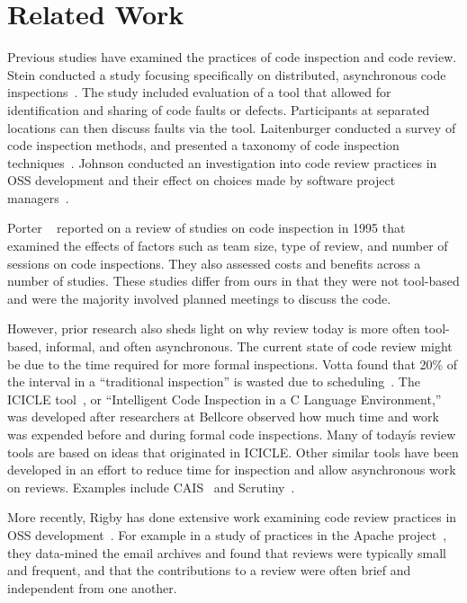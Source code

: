 
\section{Related Work} \label{sec:related_work}


Previous studies have examined the practices of code inspection and
code review.  Stein \etal conducted a study focusing specifically on
distributed, asynchronous code inspections~\cite{stein1997casestudy}. The study included evaluation
of a tool that allowed for identification and sharing of code faults or
defects. Participants at separated locations can then discuss faults via the
tool. Laitenburger conducted a survey of code inspection methods, and presented
a taxonomy of code inspection techniques~\cite{laitenberger2002survey}. Johnson conducted
an investigation into code review practices in OSS development and their
effect on choices made by software project managers~\cite{johnson2006collaboration}.

Porter \etal~\cite{porter1996review} reported on a review of studies on
code inspection in 1995 that examined the effects of factors such as team size,
type of review, and number of sessions on code inspections.  They also assessed
costs and benefits across a number of studies.  These studies differ from ours
in that they were not tool-based and were the majority involved planned
meetings to discuss the code.

However, prior research also sheds light on why review today is more often
tool-based, informal, and often asynchronous. The current state of code review
might be due to the time required for more formal inspections.  Votta found
that 20\% of the interval in a ``traditional inspection'' is wasted due to
scheduling~\cite{votta1993does}. The ICICLE tool~\cite{brothers1990icicle}, or ``Intelligent Code Inspection in a C Language Environment,'' was
developed after researchers at Bellcore observed how much time and work was
expended before and during formal code inspections. Many of todayís review
tools are based on ideas that originated in ICICLE.  Other similar tools have
been developed in an effort to reduce time for inspection and allow
asynchronous work on reviews.   Examples include CAIS~\cite{mashayekhi1994cais} 
and Scrutiny~\cite{gintell1993scrutiny}.

More recently, Rigby has done extensive work examining code review practices in
OSS development~\cite{rigby2008open, Rigb2011a, rigby2012open}.  For example in
a study of practices in the Apache project~\cite{rigby2008open},
they data-mined the email archives and found that reviews were typically small
and frequent, and that the contributions to a review were often brief and
independent from one another.

